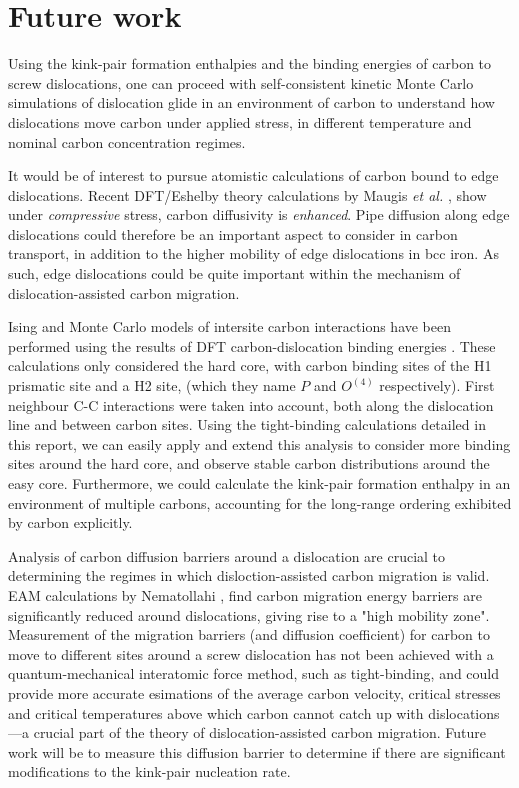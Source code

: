\documentclass[a4paper,12pt,oneside,print,numbered,index,PageStyleIII]{PhDThesisPSnPDF}
\begin{document}
\section{Future work}
\label{sec:org6f77811}

Using the kink-pair formation enthalpies and the binding energies of carbon to screw dislocations, one can proceed
with self-consistent kinetic Monte Carlo simulations of dislocation glide in an environment of carbon to
understand how dislocations move carbon under applied stress, in different temperature
and nominal carbon concentration regimes.


It would be of interest to pursue atomistic calculations of carbon bound to edge
dislocations. Recent DFT/Eshelby theory calculations by Maugis \emph{et al.} \cite{Maugis2020}, show
under \emph{compressive} stress, carbon diffusivity is \emph{enhanced}. Pipe diffusion along edge
dislocations could therefore be an important aspect to consider in carbon transport, in addition
to the higher mobility of edge dislocations in bcc iron. As such, edge dislocations could be quite
important within the mechanism of dislocation-assisted carbon migration.

Ising and Monte Carlo models of intersite carbon interactions have been performed using the
results of DFT carbon-dislocation binding energies \cite{Lthi2019}. These calculations only
considered the hard core, with carbon binding sites of the H1 prismatic site and a H2 site, (which
they name \(P\) and \(O^{(4)}\) respectively). First neighbour C-C interactions were taken
into account, both along the dislocation line and between carbon sites. Using the tight-binding
calculations detailed in this report, we can easily apply and extend this analysis to consider more
binding sites around the hard core, and observe stable carbon distributions around the
easy core. Furthermore, we could calculate the kink-pair formation enthalpy in an
environment of multiple carbons, accounting for the long-range ordering exhibited by
carbon explicitly.


Analysis of carbon diffusion barriers around a dislocation are crucial to determining
the regimes in which disloction-assisted carbon migration is valid. EAM calculations by
Nematollahi \cite{Nematollahi2016}, find carbon migration energy barriers are
significantly reduced around dislocations, giving rise to a "high mobility zone".
Measurement of the migration barriers (and diffusion coefficient) for carbon to move to
different sites around a screw dislocation has not been achieved with a
quantum-mechanical interatomic force method, such as tight-binding, and could provide more accurate
esimations of the average carbon velocity, critical stresses and critical temperatures
above which carbon cannot catch up with dislocations---a crucial part of the theory of
dislocation-assisted carbon migration. Future work will be to measure this diffusion
barrier to determine if there are significant modifications to the kink-pair nucleation
rate.
\end{document}
